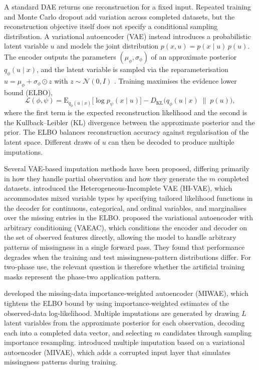 A standard DAE returns one reconstruction for a fixed input. Repeated training and Monte Carlo dropout add variation across completed datasets, but the reconstruction objective itself does not specify a conditional sampling distribution. A variational autoencoder (VAE) \citep{kingma2013auto} instead introduces a probabilistic latent variable $u$ and models the joint distribution $p(x, u) = p(x \mid u)\, p(u)$. The encoder outputs the parameters $(\mu_{\phi}, \sigma_{\phi})$ of an approximate posterior $q_{\phi}(u \mid x)$, and the latent variable is sampled via the reparameterisation $u = \mu_{\phi} + \sigma_{\phi} \odot z$ with $z \sim \mathcal{N}(0, I)$ \citep{rezende2014stochastic}. Training maximises the evidence lower bound (ELBO),
\begin{equation}
    \mathcal{L}(\phi, \psi)
    = \mathrm{E}_{q_{\phi}(u \mid x)}
      \bigl[\log p_{\psi}(x \mid u)\bigr]
    - D_{\mathrm{KL}}\bigl(q_{\phi}(u \mid x) \;\|\; p(u)\bigr),
    \label{eq:elbo}
\end{equation}
where the first term is the expected reconstruction likelihood and the second is the Kullback--Leibler (KL) divergence \citep{kullback1951information} between the approximate posterior and the prior. The ELBO balances reconstruction accuracy against regularisation of the latent space. Different draws of $u$ can then be decoded to produce multiple imputations.

Several VAE-based imputation methods have been proposed, differing primarily in how they handle partial observation and how they generate the $m$ completed datasets. \citet{nazabal2020handling} introduced the Heterogeneous-Incomplete VAE (HI-VAE), which accommodates mixed variable types by specifying tailored likelihood functions in the decoder for continuous, categorical, and ordinal variables, and marginalises over the missing entries in the ELBO. \citet{ivanov2018variational} proposed the variational autoencoder with arbitrary conditioning (VAEAC), which conditions the encoder and decoder on the set of observed features directly, allowing the model to handle arbitrary patterns of missingness in a single forward pass. They found that performance degrades when the training and test missingness-pattern distributions differ. For two-phase use, the relevant question is therefore whether the artificial training masks represent the phase-two application pattern.

\citet{mattei2019miwae} developed the missing-data importance-weighted autoencoder (MIWAE), which tightens the ELBO bound by using importance-weighted estimates of the observed-data log-likelihood. Multiple imputations are generated by drawing $L$ latent variables from the approximate posterior for each observation, decoding each into a completed data vector, and selecting $m$ candidates through sampling importance resampling. \citet{ma2023mivae} introduced multiple imputation based on a variational autoencoder (MIVAE), which adds a corrupted input layer that simulates missingness patterns during training.

